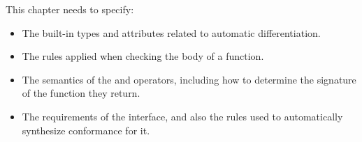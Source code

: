 
\begin{TODO}
This chapter needs to specify:


\begin{itemize}
\item The built-in types and attributes related to automatic differentiation.
\item The rules applied when checking the body of a \code{[Differentiable]} function.
\item The semantics of the  and  operators, including how to determine the signature of the function they return.
\item The requirements of the  interface, and also the rules used to automatically synthesize conformance for it.
\end{itemize}
\end{TODO}